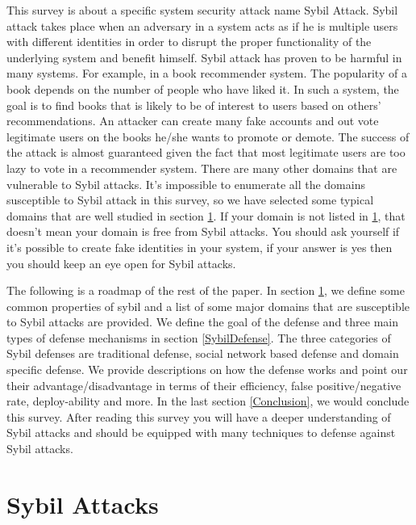 \documentclass[conference]{IEEEtran}
\begin{document}
This survey is about a specific system security attack name Sybil Attack. Sybil attack takes place when an adversary in a system acts as if he is multiple users
with different identities in order to disrupt the proper functionality of the underlying system and benefit himself. Sybil attack has proven to be harmful in many systems. 
For example, in a book recommender system.
The popularity of a book depends on the number of people who have liked it. In such a system, the goal is to find books that is likely to be of interest to users based on others'
recommendations. An attacker can create many fake accounts and out vote legitimate users on the books he/she wants to promote or demote. The success of the attack is almost guaranteed given
the fact that most legitimate users are too lazy to vote in a recommender system. 
There are many other domains that are vulnerable to Sybil attacks. It's impossible to enumerate all the domains susceptible to Sybil attack in 
this survey, so we have selected some typical domains that are well studied in section \ref{SybilAttacks}. If your domain is not listed in \ref{SybilAttacks}, 
that doesn't mean your domain is free from Sybil attacks. You should ask yourself if it's possible to create fake identities in your system, if your answer is yes then you should
keep an eye open for Sybil attacks.

The following is a roadmap of the rest of the paper.
In section \ref{SybilAttacks}, we define some common properties of sybil and a list of some major domains that are susceptible to Sybil attacks are provided.
We define the goal of the defense and three main types of defense mechanisms in section \ref{SybilDefense}. 
The three categories of Sybil defenses are traditional defense, social
network based defense and domain specific defense. We provide descriptions on how the defense works and point our their advantage/disadvantage
in terms of their efficiency, false positive/negative rate, deploy-ability and more. In the last section \ref{Conclusion}, we would conclude this survey.
After reading this survey you will have a deeper understanding of Sybil attacks and should be equipped with many techniques to defense against Sybil attacks.




\section{Sybil Attacks} \label{SybilAttacks}
\end{document}
